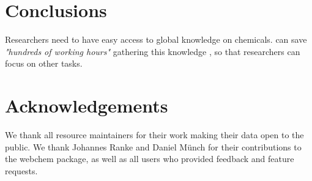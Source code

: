 \documentclass[article, shortnames]{jss}\usepackage[]{graphicx}\usepackage[]{color}
\begin{document}
\section[Conclusions]{Conclusions}
Researchers need to have easy access to global knowledge on chemicals.
 can save \emph{"hundreds of working hours"} gathering this knowledge \citep{Munch_Galizia_2016}, so that researchers can focus on other tasks.


\section*{Acknowledgements}
We thank all resource maintainers for their work making their data open to the public.
We thank Johannes Ranke and Daniel Münch for their contributions to the webchem package, as well as all users who provided feedback and feature requests.



\end{document}
